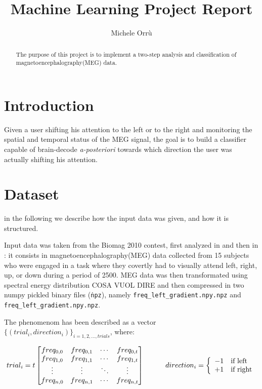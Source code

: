 \documentclass[10pt]{article}
\title{\textbf{Machine Learning Project Report }}
\author{Michele Orr\`u}
\begin{document}
\maketitle

\begin{abstract}
The purpose of this project is to implement a two-step analysis and classification of magnetoencephalography(MEG) data. 
\end{abstract}



\section{Introduction}
Given a user shifting his attention to the left or to the right and monitoring the spatial and temporal status of the MEG\cite{Biomag2010} signal, the goal is to build a classifier capable of brain-decode \textit{a-posteriori} towards which direction the user was actually shifting his attention.



\section{Dataset}
in the following we describe how the input data was given, and how it is structured. 

Input data was taken from the Biomag 2010 contest, first analyzed in 
\cite{Biomag2010} and then in \cite{Braindecoding}: it consists in
 magnetoencephalography(MEG) data collected from 15 subjects who were engaged in
a task where they covertly had to visually attend left, right, up, or down during a
period of 2500\milli\second. 
MEG data was then transformated using spectral energy distribution COSA VUOL DIRE
and then compressed in two numpy pickled binary files (\texttt{\.npz}), 
namely \texttt{freq\_left\_gradient.npy.npz} and 
\texttt{freq\_left\_gradient.npy.npz}.

The phenomenom has been described as a vector
$\{(trial_i, direction_i)\}_{i= 1, 2, \dots, trials}$, where:

$$
trial_i  = t
 \begin{bmatrix}
   freq_{0, 0} & freq_{0, 1} & \cdots & freq_{0, t}  \\
   freq_{1, 0} & freq_{1, 1} & \cdots & freq_{1, t}  \\
   \vdots      & \vdots      & \ddots & \vdots       \\
   freq_{n, 0} & freq_{n, 1} & \cdots & freq_{n, t} 
 \end{bmatrix}
\hspace{30pt}
 direction_i = \left\{
 \begin{array}{l l}
   -1 & \text{if left}\\
   +1 & \text{if right}\\
 \end{array}\right .
$$
\end{document}

